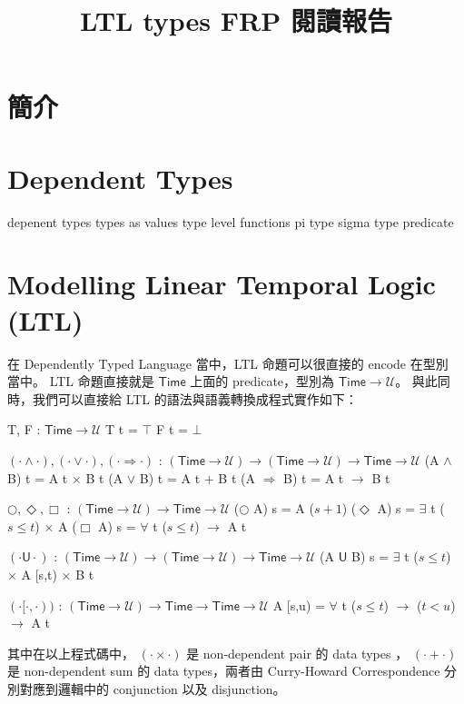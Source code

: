 \documentclass{article}
\newcommand{\U}{\mathcal{U}}
\begin{document}
\title{LTL types FRP 閱讀報告}
\author{}
\date{}
\maketitle

\newcommand{\Time}{\mathsf{Time}}

\section{簡介}
\section{Dependent Types}
  depenent types
  types as values
  type level functions
  pi type
  sigma type
  predicate

\section{Modelling Linear Temporal Logic (LTL)}
  在 Dependently Typed Language 當中，LTL 命題可以很直接的 encode 在型別
  當中。 LTL 命題直接就是 $\Time$ 上面的 predicate，型別為 $\Time\to\U$。
  與此同時，我們可以直接給 LTL 的語法與語義轉換成程式實作如下：

  \begin{code}
  T, F : $\Time\to\U$
  T t = $\top$
  F t = $\bot$

  $(\cdot\land\cdot), (\cdot\lor\cdot), (\cdot\Rightarrow\cdot)$ : $(\Time\to\U)\to(\Time\to\U)\to\Time\to\U$
  (A $\land$ B) t = A t $\times$ B t
  (A $\lor$ B) t = A t + B t
  (A $\Rightarrow$ B) t = A t $\to$ B t

  $\bigcirc,\Diamond,\Box$ : $(\Time\to\U)\to\Time\to\U$
  ($\bigcirc$ A) s = A ($s+1$)
  ($\Diamond$ A) s = $\exists$ {t} ($s\le t$) $\times$ A 
  ($\Box$ A) s = $\forall$ {t} ($s\le t$) $\to$ A t

  $(\cdot\mathsf{U}\cdot)$ : $(\Time\to\U)\to(\Time\to\U)\to\Time\to\U$
  (A $\mathsf{U}$ B) s = $\exists$ {t} ($s\le t$) $\times$ A [s,t) $\times$ B t

  $(\cdot[\cdot,\cdot))$ : $(\Time\to\U)\to\Time\to\Time\to\U$
  A [s,u) = $\forall$ {t} ($s\le t$) $\to$ ($t<u$) $\to$ A t
  \end{code}

  其中在以上程式碼中， $(\cdot\times\cdot)$ 是 non-dependent pair 的 data types
  ， $(\cdot+\cdot)$ 是 non-dependent sum 的 data types，兩者由 Curry-Howard
  Correspondence 分別對應到邏輯中的 conjunction 以及 disjunction。
\end{document}
